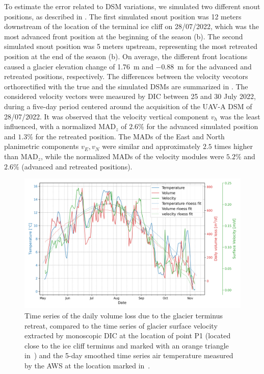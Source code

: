 To estimate the error related to DSM variations, we simulated two different snout
positions, as described in .
The first simulated snout position was 12 meters
downstream of the location of the terminal ice cliff on 28/07/2022, which was the most
advanced front position at the beginning of the season
(b).
The second simulated snout position was 5 meters upstream, representing the most
retreated position at the end of the season (b).
On average, the different front locations caused a glacier elevation change of
\SI{+1.76}{\meter} and \SI{-0.88}{\meter} for the advanced
and retreated positions, respectively.
The differences between the velocity vecotors orthorectified with the true and the
simulated DSMs are
summarized in .
The considered velocity vectors were measured by DIC between 25 and 30 July 2022, during
a five-day period centered around the acquisition of the UAV-A DSM of 28/07/2022.
It was observed that the velocity vertical component \(v_h\) was the least influenced,
with a normalized MAD\(_z\) of \(2.6\%\) for
the advanced simulated position and \(1.3\%\) for the retreated position. The MADs of the
East and North planimetric components \(v_E, v_N\) were similar and approximately \(2.5\)
times higher than MAD\(_z\), while the normalized MADs of the velocity modules were
\(5.2\%\) and \(2.6\%\) (advanced and retreated positions).

\begin{figure}[ht]
  \centering
  \includegraphics[width=1\textwidth]{4_TS_P1.png}
  \caption{Time series of the daily volume loss due to the glacier terminus retreat,
    compared to the time series of glacier surface velocity extracted by monoscopic DIC at the location of point P1 (located close to the ice cliff terminus and marked with an orange triangle in~) and the 5-day smoothed time series air temperature measured by the AWS at the location marked in~.}
  \label{fig:4:TS_punto-fronte}
\end{figure}

